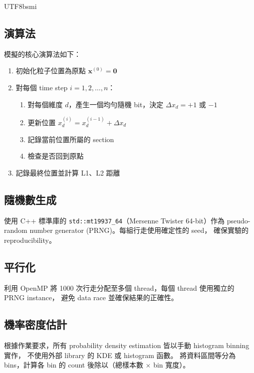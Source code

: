 \documentclass[12pt, a4paper]{article}
\begin{document}
\begin{CJK}{UTF8}{bsmi}
\subsection{演算法}

模擬的核心演算法如下：
\begin{enumerate}[nosep]
  \item 初始化粒子位置為原點 $\mathbf{x}^{(0)} = \mathbf{0}$
  \item 對每個 time step $i = 1, 2, \ldots, n$：
    \begin{enumerate}
      \item 對每個維度 $d$，產生一個均勻隨機 bit，決定 $\Delta x_d = +1$ 或 $-1$
      \item 更新位置 $x_d^{(i)} = x_d^{(i-1)} + \Delta x_d$
      \item 記錄當前位置所屬的 section
      \item 檢查是否回到原點
    \end{enumerate}
  \item 記錄最終位置並計算 L1、L2 距離
\end{enumerate}

\subsection{隨機數生成}

使用 C++ 標準庫的 \texttt{std::mt19937\_64}（Mersenne Twister 64-bit）作為
pseudo-random number generator (PRNG)。每組行走使用確定性的 seed，
確保實驗的 reproducibility。

\subsection{平行化}

利用 OpenMP 將 1000 次行走分配至多個 thread，每個 thread 使用獨立的 PRNG instance，
避免 data race 並確保結果的正確性。

\subsection{機率密度估計}

根據作業要求，所有 probability density estimation 皆以手動 histogram binning 實作，
不使用外部 library 的 KDE 或 histogram 函數。
將資料區間等分為 bins，計算各 bin 的 count 後除以（總樣本數 $\times$ bin 寬度）。


\end{CJK}
\end{document}
